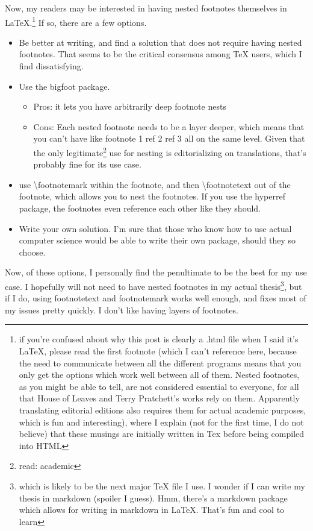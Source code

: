 \documentclass[12pt]{article}[titlepage]
\newcommand{\1}{\={a}}
\newcommand{\2}{\={e}}
\newcommand{\3}{\={\i}}
\newcommand{\4}{\=o}
\newcommand{\5}{\=u}
\newcommand{\6}{\={A}}
\renewcommand{\,}{\textsuperscript{,}}
\begin{document}
Now, my readers may be interested in having nested footnotes themselves in LaTeX.\footnote{if you're confused about why this post is clearly a .html file when I said it's LaTeX, please read the first footnote (which I can't reference here, because the need to communicate between all the different programs means that you only get the options which work well between all of them. Nested footnotes, as you might be able to tell, are not considered essential to everyone, for all that House of Leaves and Terry Pratchett's works rely on them. Apparently translating editorial editions also requires them for actual academic purposes, which is fun and interesting), where I explain (not for the first time, I do not believe) that these musings are initially written in Tex before being compiled into HTML}
If so, there are a few options.
\begin{itemize}
\item Be better at writing, and find a solution that does not require having nested footnotes.
That seems to be the critical consensus among TeX users, which I find dissatisfying.
\item Use the bigfoot package.
\begin{itemize}
\item Pros: it lets you have arbitrarily deep footnote nests
\item Cons: Each nested footnote needs to be a layer deeper, which means that you can't have like footnote 1 ref 2 ref 3 all on the same level.
Given that the only legitimate\footnote{read: academic} use for nesting is editorializing on translations, that's probably fine for its use case.
\end{itemize}
\item use \textbackslash{}footnotemark within the footnote, and then \textbackslash{}footnotetext out of the footnote, which allows you to nest the footnotes.
If you use the hyperref package, the footnotes even reference each other like they should.
\item Write your own solution.
I'm sure that those who know how to use actual computer science would be able to write their own package, should they so choose.
\end{itemize}

Now, of these options, I personally find the penultimate to be the best for my use case.
I hopefully will not need to have nested footnotes in my actual thesis\footnote{which is likely to be the next major TeX file I use. I wonder if I can write my thesis in markdown (spoiler I guess). Hmm, there's a markdown package which allows for writing in markdown in LaTeX. That's fun and cool to learn}, but if I do, using footnotetext and footnotemark works well enough, and fixes most of my issues pretty quickly.
I don't like having layers of footnotes.
\end{document}
